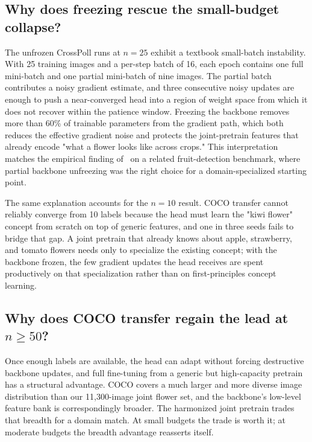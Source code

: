 \subsection{Why does freezing rescue the small-budget collapse?}

The unfrozen CrossPoll runs at $n{=}25$ exhibit a textbook small-batch instability. With 25 training images and a per-step batch of 16, each epoch contains one full mini-batch and one partial mini-batch of nine images. The partial batch contributes a noisy gradient estimate, and three consecutive noisy updates are enough to push a near-converged head into a region of weight space from which it does not recover within the patience window. Freezing the backbone removes more than 60\% of trainable parameters from the gradient path, which both reduces the effective gradient noise and protects the joint-pretrain features that already encode "what a flower looks like across crops." This interpretation matches the empirical finding of~\cite{gandhi2025fine} on a related fruit-detection benchmark, where partial backbone unfreezing was the right choice for a domain-specialized starting point.

The same explanation accounts for the $n{=}10$ result. COCO transfer cannot reliably converge from 10 labels because the head must learn the "kiwi flower" concept from scratch on top of generic features, and one in three seeds fails to bridge that gap. A joint pretrain that already knows about apple, strawberry, and tomato flowers needs only to specialize the existing concept; with the backbone frozen, the few gradient updates the head receives are spent productively on that specialization rather than on first-principles concept learning.

\subsection{Why does COCO transfer regain the lead at $n \geq 50$?}

Once enough labels are available, the head can adapt without forcing destructive backbone updates, and full fine-tuning from a generic but high-capacity pretrain has a structural advantage. COCO covers a much larger and more diverse image distribution than our 11{,}300-image joint flower set, and the backbone's low-level feature bank is correspondingly broader. The harmonized joint pretrain trades that breadth for a domain match. At small budgets the trade is worth it; at moderate budgets the breadth advantage reasserts itself.

